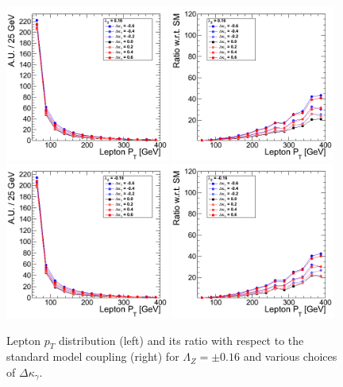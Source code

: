 \begin{figure}[h!t]
  {\centering
    \includegraphics[width=0.48\textwidth]{figs/LeptonpT_016.png}
    \includegraphics[width=0.48\textwidth]{figs/LeptonpT_016_ratio.png}
    \includegraphics[width=0.48\textwidth]{figs/LeptonpT_m016.png}
    \includegraphics[width=0.48\textwidth]{figs/LeptonpT_m016_ratio.png}
    \caption{Lepton $p_T$ distribution (left) and its ratio with respect to 
    the standard model coupling (right) for $\Lambda_Z = \pm 0.16$ and various choices of $\Delta{\kappa_\gamma}$.}
    \label{fig:ww_LeptonpT_atgcRatio016}}
\end{figure}

